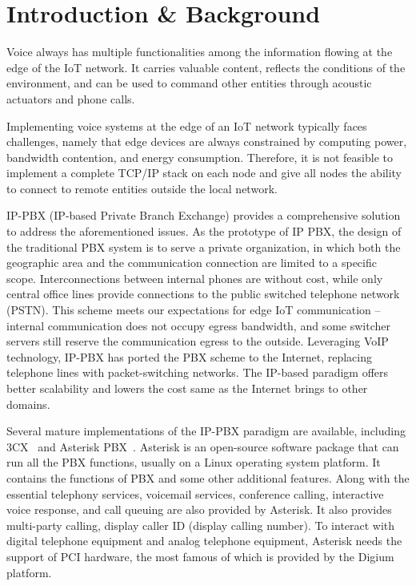 \section{Introduction \& Background}	
\label{sec:introduction-background}
Voice always has multiple functionalities among the information flowing at the edge of the IoT network. It carries valuable content, reflects the conditions of the environment, and can be used to command other entities through acoustic actuators and phone calls.

Implementing voice systems at the edge of an IoT network typically faces challenges, namely that edge devices are always constrained by computing power, bandwidth contention, and energy consumption. Therefore, it is not feasible to implement a complete TCP/IP stack on each node and give all nodes the ability to connect to remote entities outside the local network.

IP-PBX (IP-based Private Branch Exchange) provides a comprehensive solution to address the aforementioned issues. As the prototype of IP PBX, the design of the traditional PBX system is to serve a private organization, in which both the geographic area and the communication connection are limited to a specific scope. Interconnections between internal phones are without cost, while only central office lines provide connections to the public switched telephone network (PSTN). This scheme meets our expectations for edge IoT communication -- internal communication does not occupy egress bandwidth, and some switcher servers still reserve the communication egress to the outside. Leveraging VoIP technology, IP-PBX has ported the PBX scheme to the Internet, replacing telephone lines with packet-switching networks. The IP-based paradigm offers better scalability and lowers the cost same as the Internet brings to other domains. 

Several mature implementations of the IP-PBX paradigm are available, including 3CX~\cite{3cx_2022} and Asterisk PBX~\cite{sangoma-technologies}. Asterisk is an open-source software package that can run all the PBX functions, usually on a Linux operating system platform. It contains the functions of PBX and some other additional features. Along with the essential telephony services, voicemail services, conference calling, interactive voice response, and call queuing are also provided by Asterisk. It also provides multi-party calling, display caller ID (display calling number). To interact with digital telephone equipment and analog telephone equipment, Asterisk needs the support of PCI hardware, the most famous of which is provided by the Digium platform. 

